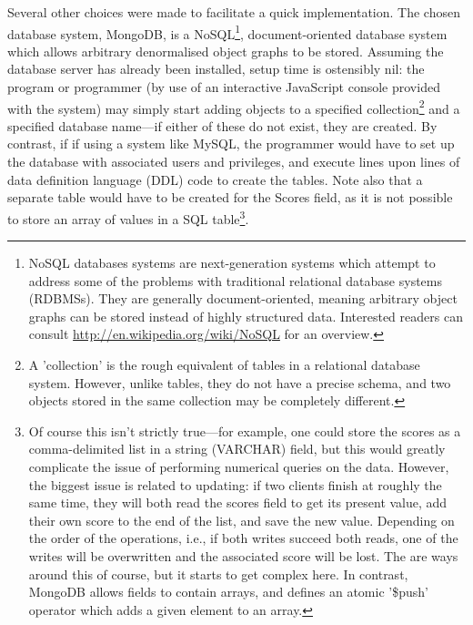 Several other choices were made to facilitate a quick implementation.  The chosen database system, MongoDB, is a NoSQL\footnote{NoSQL databases systems are next-generation systems which attempt to address some of the problems with traditional relational database systems (RDBMSs).  They are generally document-oriented, meaning arbitrary object graphs can be stored instead of highly structured data.  Interested readers can consult \url{http://en.wikipedia.org/wiki/NoSQL} for an overview.}, document-oriented database system which allows arbitrary denormalised object graphs to be stored.  Assuming the database server has already been installed, setup time is ostensibly nil: the program or programmer (by use of an interactive JavaScript console provided with the system) may simply start adding objects to a specified collection\footnote{A 'collection' is the rough equivalent of tables in a relational database system.  However, unlike tables, they do not have a precise schema, and two objects stored in the same collection may be completely different.} and a specified database name---if either of these do not exist, they are created.  By contrast, if if using a system like MySQL, the programmer would have to set up the database with associated users and privileges, and execute lines upon lines of data definition language (DDL) code to create the tables.  Note also that a separate table would have to be created for the Scores field, as it is not possible to store an array of values in a SQL table\footnote{Of course this isn't strictly true---for example, one could store the scores as a comma-delimited list in a string (VARCHAR) field, but this would greatly complicate the issue of performing numerical queries on the data.  However, the biggest issue is related to updating: if two clients finish at roughly the same time, they will both read the scores field to get its present value, add their own score to the end of the list, and save the new value.  Depending on the order of the operations, i.e., if both writes succeed both reads, one of the writes will be overwritten and the associated score will be lost.  The are ways around this of course, but it starts to get complex here.  In contrast, MongoDB allows fields to contain arrays, and defines an atomic '\$push' operator which adds a given element to an array.}.


